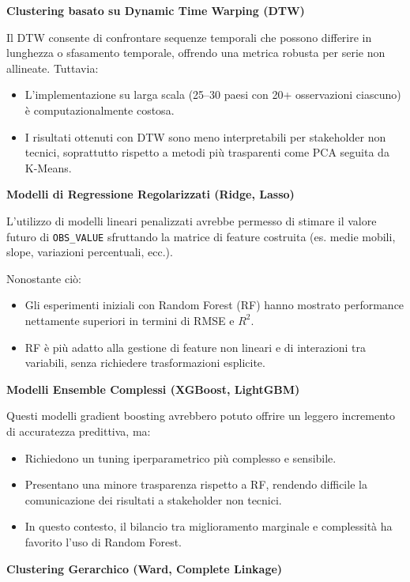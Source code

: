 \documentclass[conference]{IEEEtran}
\begin{document}
\begin{itemize}
{\noindent\textbf{Clustering basato su Dynamic Time Warping (DTW)}

Il DTW consente di confrontare sequenze temporali che possono differire in lunghezza o sfasamento temporale, offrendo una metrica robusta per serie non allineate. Tuttavia:

\begin{itemize}
    \item L’implementazione su larga scala (25–30 paesi con 20+ osservazioni ciascuno) è computazionalmente costosa.
    \item I risultati ottenuti con DTW sono meno interpretabili per stakeholder non tecnici, soprattutto rispetto a metodi più trasparenti come PCA seguita da K-Means.
\end{itemize}

\noindent\textbf{Modelli di Regressione Regolarizzati (Ridge, Lasso)}

L’utilizzo di modelli lineari penalizzati avrebbe permesso di stimare il valore futuro di \texttt{OBS\_VALUE} sfruttando la matrice di feature costruita (es. medie mobili, slope, variazioni percentuali, ecc.).

Nonostante ciò:
\begin{itemize}
    \item Gli esperimenti iniziali con Random Forest (RF) hanno mostrato performance nettamente superiori in termini di RMSE e $R^2$.
    \item RF è più adatto alla gestione di feature non lineari e di interazioni tra variabili, senza richiedere trasformazioni esplicite.
\end{itemize}

\noindent\textbf{Modelli Ensemble Complessi (XGBoost, LightGBM)}

Questi modelli gradient boosting avrebbero potuto offrire un leggero incremento di accuratezza predittiva, ma:

\begin{itemize}
    \item Richiedono un tuning iperparametrico più complesso e sensibile.
    \item Presentano una minore trasparenza rispetto a RF, rendendo difficile la comunicazione dei risultati a stakeholder non tecnici.
    \item In questo contesto, il bilancio tra miglioramento marginale e complessità ha favorito l’uso di Random Forest.
\end{itemize}

\noindent\textbf{Clustering Gerarchico (Ward, Complete Linkage)}

}
\end{itemize}
\end{document}
